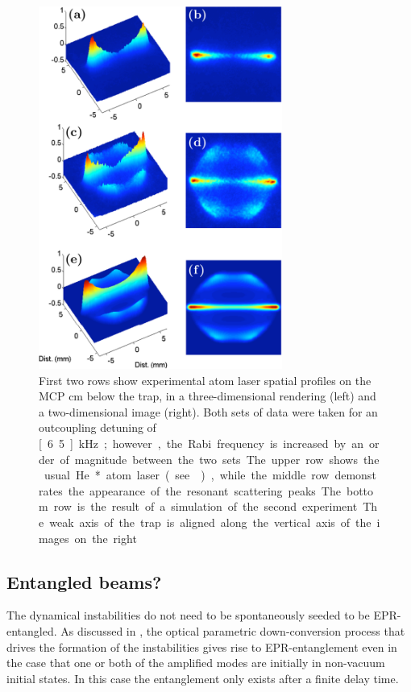 \begin{figure}
    \centering
    \includegraphics[width=8cm]{ExpTheoryComparison}
    \caption{First two rows show experimental atom laser spatial profiles on the MCP \unit[4]{cm} below the trap, in a three-dimensional rendering (left) and a two-dimensional image (right). Both sets of data were taken for an outcoupling detuning of \unit[6.5]{kHz}; however, the Rabi frequency is increased by an order of magnitude between the two sets. The upper row shows the usual He* atom laser (see ), while the middle row demonstrates the appearance of the resonant scattering peaks. The bottom row is the result of a simulation of the second experiment. The weak axis of the trap is aligned along the vertical axis of the images on the right.\label{Peaks:ExpTheoryComparison}}
\end{figure}

\subsection{Entangled beams?}

The dynamical instabilities do not need to be spontaneously seeded to be EPR-entangled.  As discussed in , the optical parametric down-conversion process that drives the formation of the instabilities gives rise to EPR-entanglement even in the case that one or both of the amplified modes are initially in non-vacuum initial states.  In this case the entanglement only exists after a finite delay time.  

